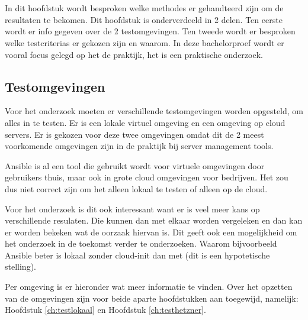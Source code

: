 
\chapter{}
\label{ch:methodologie}

In dit hoofdstuk wordt besproken welke methodes er gehandteerd zijn om de resultaten te bekomen. Dit hoofdstuk is onderverdeeld in 2 delen. Ten eerste wordt er info gegeven over de 2 testomgevingen. Ten tweede wordt er besproken welke testcriterias er gekozen zijn en waarom. In deze bachelorproef wordt er vooral focus gelegd op het de praktijk, het is een praktische onderzoek.

\section{Testomgevingen}
Voor het onderzoek moeten er verschillende testomgevingen worden opgesteld, om alles in te testen. Er is een lokale virtuel  omgeving en een omgeving op cloud servers. Er is gekozen voor deze twee omgevingen omdat dit de 2 meest voorkomende omgevingen zijn in de praktijk bij server management tools. 

Ansible is al een tool die gebruikt wordt voor virtuele omgevingen door gebruikers thuis, maar ook in grote cloud omgevingen voor bedrijven. Het zou dus niet correct zijn om het alleen lokaal te testen of alleen op de cloud. 

Voor het onderzoek is dit ook interessant want er is veel meer kans op verschillende resulaten. Die kunnen dan met elkaar worden vergeleken en dan kan er worden bekeken wat de oorzaak hiervan is. Dit geeft ook een mogelijkheid om het onderzoek in de toekomst verder te onderzoeken. Waarom bijvoorbeeld Ansible beter is lokaal zonder cloud-init dan met (dit is een hypotetische stelling).

\newpage
Per omgeving is er hieronder wat meer informatie te vinden. Over het opzetten van de omgevingen zijn voor beide aparte hoofdstukken aan toegewijd, namelijk: Hoofdstuk \ref*{ch:testlokaal} en Hoofdstuk \ref*{ch:testhetzner}.

